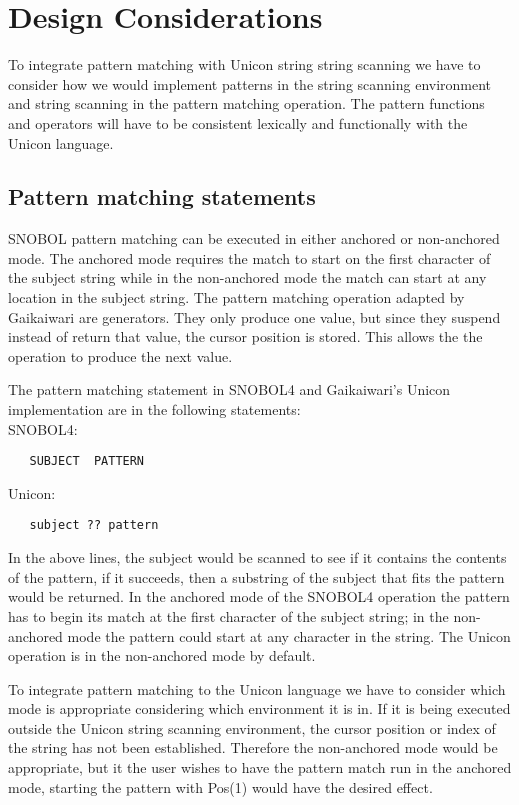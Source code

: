 \documentclass{article}
\begin{document}
\section{Design Considerations}

To integrate pattern matching with Unicon string string scanning we have to consider how we would implement patterns in the string scanning environment and string scanning in the pattern matching operation.  The pattern functions and operators will have to be consistent lexically and functionally with the Unicon language.

\subsection{Pattern matching statements}
SNOBOL pattern matching can be executed in either anchored or non-anchored mode.  The anchored mode requires the match to start on the first character of the subject string while in the non-anchored mode the match can start at any location in the subject string.\cite{Snobol}  The pattern matching operation adapted by Gaikaiwari are generators.\cite{Gaikaiwari2005}  They only produce one value, but since they suspend instead of return that value, the cursor position is stored.  This allows the the operation to produce the next value. \cite{JefferyUnicon}

The pattern matching statement in SNOBOL4 and Gaikaiwari's Unicon implementation are in the following statements:\\

\noindent
SNOBOL4:
\linespread{1}
\begin{verbatim}
   SUBJECT  PATTERN
\end{verbatim}
\noindent
Unicon:
\begin{verbatim}
   subject ?? pattern
\end{verbatim}

In the above lines, the subject would be scanned to see if it contains the contents of the pattern, if it succeeds, then a substring of the subject that fits the pattern would be returned.  In the anchored mode of the SNOBOL4 operation the pattern has to begin its match at the first character of the subject string; in the non-anchored mode the pattern could start at any character in the string. \cite{Snobol}  The Unicon operation is in the non-anchored mode by default. \cite{Gaikaiwari2005}

To integrate pattern matching to the Unicon language we have to consider which mode is appropriate considering which environment it is in.  If it is being executed outside the Unicon string scanning environment, the cursor position or index of the string has not been established.  Therefore the non-anchored mode would be appropriate, but it the user wishes to have the pattern match run in the anchored mode, starting the pattern with Pos(1) would have the desired effect.
\end{document}
